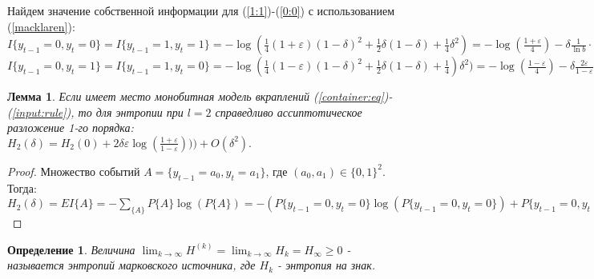 \documentclass[a4paper,12pt]{article}
\theoremstyle{plain}
\newtheorem{definition}{Определение}[section]
\newtheorem{lemma}{Лемма}[section]
\begin{document}
Найдем значение собственной информации для (\ref{1:1})-(\ref{0:0}) с использованием (\ref{macklaren}):
$
	I\{y_{t-1}=0, y_t = 0 \}=I\{y_{t-1}=1, y_t = 1 \}= -\log(\frac{1}{4}(1+\varepsilon)(1-\delta)^2+\frac{1}{2}\delta(1-\delta)+\frac{1}{4}\delta^2) = -\log (\frac{1+\varepsilon}{4}) - \delta \frac{1}{\ln b}\cdot\frac{-2\varepsilon}{1+\varepsilon} + o(\delta^2));
$\\
$
I\{y_{t-1}=0, y_t = 1 \}=I\{y_{t-1}=1, y_t = 0 \}= -\log(\frac{1}{4}(1-\varepsilon)(1-\delta)^2+\frac{1}{2}\delta(1-\delta)+\frac{1}{4})\delta^2) = -\log (\frac{1-\varepsilon}{4}) - \delta \frac{2\varepsilon}{1-\varepsilon} + o(\delta^2)).
$
\begin{lemma}
		Если имеет место монобитная модель вкраплений (\ref{container:eq})-(\ref{input:rule}), то для энтропии при $l=2$ справедливо ассиптотическое разложение 1-го порядка:\\
	$
	H_2(\delta) = H_2(0) + 2\delta\varepsilon\log(\frac{1+\varepsilon}{1-\varepsilon})))+O(\delta^2).
	$
\end{lemma}
\begin{proof}
	Множество событий $A=\{y_{t-1}=a_0, y_t=a_1\}$,  где $(a_0, a_1) \in \{0,1\}^2$. Тогда:\\ 
	$H_2(\delta)=EI\{A\}=-\sum_{\{A\}}P\{A\}\log(P\{A\}) = -( P\{y_{t-1}=0, y_t = 0\}\log(P\{y_{t-1}=0, y_t = 0\}) + P\{y_{t-1}=0, y_t = 1\}\log(P\{y_{t-1}=0, y_t = 1\}) +P\{y_{t-1}=1, y_t = 0\}\log(P\{y_{t-1}=1, y_t = 0\}) +P\{y_{t-1}=1, y_t = 1\}\log(P\{y_{t-1}=1, y_t = 1\})) = -2 (P\{y_{t-1}=0, y_t = 0\}\log(P\{y_{t-1}=0, y_t = 0\}) +P\{y_{t-1}=0, y_t = 0\}\log(P\{y_{t-1}=0, y_t = 1\}) )=-2((\delta^2\frac{\varepsilon}{4}-\delta\frac{\varepsilon}{2}+\frac{1+\varepsilon}{4})(-\log(\frac{1+\varepsilon}{4})+ \delta \frac{1}{\ln b}\cdot \frac{2\varepsilon}{1+\varepsilon}+o(\delta^2)) + (-\delta^2\frac{\varepsilon}{4}+\delta\frac{\varepsilon}{2}+\frac{1-\varepsilon}{4})(-\log(\frac{1-\varepsilon}{4}) - \delta \frac{1}{\ln b}\cdot \frac{2\varepsilon}{1-\varepsilon}+o(\delta^2)))=\frac{1}{2}(-(1+\varepsilon) \log(\frac{1+\varepsilon}{4}) - (1-\varepsilon)\log(\frac{1-\varepsilon}{4}) + 2\delta\varepsilon\log(\frac{1+\varepsilon}{1-\varepsilon})))+O(\delta^2) =H_2(0) + 2\delta\varepsilon\log(\frac{1+\varepsilon}{1-\varepsilon})))+O(\delta^2)$
\end{proof}

\begin{definition}\cite{duhin}
	Величина $\lim_{k\to \infty}H^{(k)}= \lim_{k\to \infty}H_{k}=H_{\infty} \geqslant 0$ - называется энтропий марковского источника, где $H_{k}$ - энтропия на знак.
\end{definition}
\end{document}
